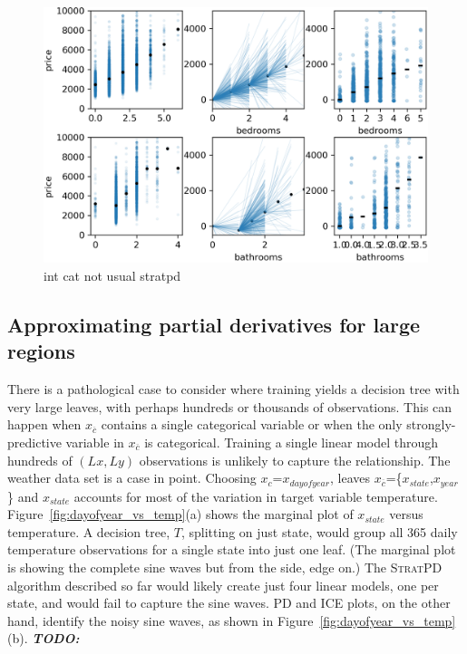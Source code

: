 \documentclass[12pt]{article}
\newcommand{\figref}[1]{Figure~\ref{#1}}
\newcommand{\todo}[1]{{\bf\em TODO:} {{\color{red}{#1}}}}
\newcommand{\spd}{\fontfamily{cmr}\textsc{\small StratPD}}
\newcommand{\xnc}{$x_{\overline{c}}$}
\begin{document}
\begin{figure}[htbp]
\begin{center}
\includegraphics[scale=0.7]{images/rent_intcat.png}
\caption{int cat not usual stratpd}
\label{fig:rent_intcat}
\end{center}
\end{figure}


\subsection{Approximating partial derivatives for large regions}\label{sec:patho}

There is a pathological case to consider where training yields a decision tree with very large leaves, with perhaps hundreds or thousands of observations.  This can happen when \xnc{} contains a single categorical variable or when the only strongly-predictive variable in \xnc{} is categorical.  Training a single linear model through hundreds of $(Lx, Ly)$ observations is unlikely to capture the relationship.  The weather data set is a case in point. Choosing $x_c$=$x_{dayofyear}$, leaves \xnc{}=\{$x_{state}$,$x_{year}$\} and $x_{state}$ accounts for most of the variation in target variable temperature.  \figref{fig:dayofyear_vs_temp}(a) shows the marginal plot of $x_{state}$ versus temperature. A decision tree, $T$, splitting on just state, would group all 365 daily temperature observations for a single state into just one leaf. (The marginal plot is showing the complete sine waves but from the side, edge on.)  The \spd{} algorithm described so far would likely create just four linear models, one per state, and would fail to capture the sine waves. PD and ICE plots, on the other hand, identify the noisy sine waves, as shown in \figref{fig:dayofyear_vs_temp}(b). \todo{uses random forest with how many trees for pd/ice?}
\end{document}
